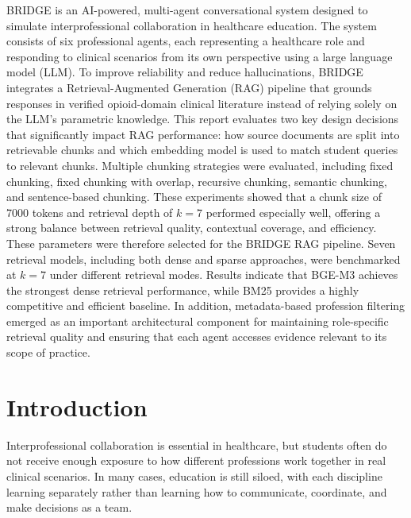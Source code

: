\documentclass[12pt]{article}
\begin{document}
\begin{titlepage}
\begin{minipage}{0.88\textwidth}
\small
BRIDGE is an AI-powered, multi-agent conversational system designed to simulate interprofessional collaboration in healthcare education. The system consists of six professional agents, each representing a healthcare role and responding to clinical scenarios from its own perspective using a large language model (LLM). To improve reliability and reduce hallucinations, BRIDGE integrates a Retrieval-Augmented Generation (RAG) pipeline that grounds responses in verified opioid-domain clinical literature instead of relying solely on the LLM's parametric knowledge. This report evaluates two key design decisions that significantly impact RAG performance: how source documents are split into retrievable chunks and which embedding model is used to match student queries to relevant chunks. Multiple chunking strategies were evaluated, including fixed chunking, fixed chunking with overlap, recursive chunking, semantic chunking, and sentence-based chunking. These experiments showed that a chunk size of 7000 tokens and retrieval depth of $k = 7$ performed especially well, offering a strong balance between retrieval quality, contextual coverage, and efficiency. These parameters were therefore selected for the BRIDGE RAG pipeline. Seven retrieval models, including both dense and sparse approaches, were benchmarked at $k = 7$ under different retrieval modes. Results indicate that BGE-M3 achieves the strongest dense retrieval performance, while BM25 provides a highly competitive and efficient baseline. In addition, metadata-based profession filtering emerged as an important architectural component for maintaining role-specific retrieval quality and ensuring that each agent accesses evidence relevant to its scope of practice.
\end{minipage}
\end{titlepage}

\tableofcontents
\newpage

\section{Introduction}

Interprofessional collaboration is essential in healthcare, but students often do not receive enough exposure to how different professions work together in real clinical scenarios. In many cases, education is still siloed, with each discipline learning separately rather than learning how to communicate, coordinate, and make decisions as a team.
\end{document}
